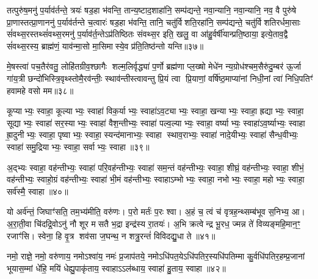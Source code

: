तत्पुरु॑ष॒मनु॑ प॒र्याव॑र्तन्ते॒ त्रयः॑ षड॒हा भ॑वन्ति॒ तान्य॒ष्टाद॒शाहा॑नि॒ सम्प॑द्यन्ते॒ नवा॒न्यानि॒ नवा॒न्यानि॒ नव॒ वै पुरु॑षे प्रा॒णास्तत्प्रा॒णाननु॑ प॒र्याव॑र्तन्ते च॒त्वारः॑ षड॒हा भ॑वन्ति॒ तानि॒ चतु॑र्विशति॒रहा॑नि॒ सम्प॑द्यन्ते॒ चतु॑र्विशतिरर्धमा॒साः सं॑वथ्स॒रस्तथ्सं॑वथ्स॒रमनु॑ प॒र्याव॑र्त॒न्तेऽप्र॑तिष्ठितः संवथ्स॒र इति॒ खलु॒ वा आ॑हु॒र्वर्\mbox{}षी॑यान्प्रति॒ष्ठाया॒ इत्ये॒ताव॒द्वै सं॑वथ्स॒रस्य॒ ब्राह्म॑णं॒ याव॑न्मा॒सो मा॒सिमास्ये॒व प्र॑ति॒तिष्ठ॑न्तो यन्ति॥३७॥

{\anuvakamend[{वि॒राज॑मे॒तेन॑ द्वाद॒शावे॒ताव॒द्वा अ॒ष्टौ च॑॥11॥}]}

मे॒षस्त्वा॑ पच॒तैर॑वतु॒ लोहि॑तग्रीव॒श्छागैः शल्म॒लिर्वृद्ध्या॑ प॒र्णो ब्रह्म॑णा प्ल॒ख्षो मेधे॑न न्य॒ग्रोध॑श्चम॒सैरु॑दु॒म्बर॑ ऊ॒र्जा गा॑य॒त्री छन्दो॑भिस्त्रि॒वृथ्स्तोमै॒रव॑न्तीः॒ स्थाव॑न्तीस्त्वावन्तु प्रि॒यं त्वा प्रि॒याणां॒ वर्\mbox{}षि॑ष्ठ॒माप्या॑नां निधी॒नां त्वा॑ निधि॒पतिꣳ॑ हवामहे वसो मम॥३८॥

{\anuvakamend[{मे॒षष्षट्त्रिꣳ॑शत्॥12॥}]}

कूप्याभ्यः॒ स्वाहा॒ कूल्याभ्यः॒ स्वाहा॑ विक॒र्याभ्यः॒ स्वाहा॑ऽव॒ट्याभ्यः॒ स्वाहा॒ खन्याभ्यः॒ स्वाहा॒ ह्रद्याभ्यः॒ स्वाहा॒ सूद्याभ्यः॒ स्वाहा॑ सर॒स्याभ्यः॒ स्वाहा॑ वैश॒न्तीभ्यः॒ स्वाहा॑ पल्व॒ल्याभ्यः॒ स्वाहा॒ वर्ष्याभ्यः॒ स्वाहा॑ऽव॒र्ष्याभ्यः॒ स्वाहा ह्रा॒दुनीभ्यः॒ स्वाहा॒ पृष्वाभ्यः॒ स्वाहा॒ स्यन्द॑मानाभ्यः॒ स्वाहा स्थाव॒राभ्यः॒ स्वाहा॑ नादे॒यीभ्यः॒ स्वाहा॑ सैन्ध॒वीभ्यः॒ स्वाहा॑ समु॒द्रियाभ्यः॒ स्वाहा॒ सर्वाभ्यः॒ स्वाहा॥३९॥

{\anuvakamend[{कूप्याभ्यश्चत्वारि॒ꣳ॒शत्॥13॥}]}

अ॒द्भ्यः स्वाहा॒ वह॑न्तीभ्यः॒ स्वाहा॑ परि॒वह॑न्तीभ्यः॒ स्वाहा॑ सम॒न्तं वह॑न्तीभ्यः॒ स्वाहा॒ शीघ्रं॒ वह॑न्तीभ्यः॒ स्वाहा॒ शीभं॒ वह॑न्तीभ्यः॒ स्वाहो॒ग्रं वह॑न्तीभ्यः॒ स्वाहा॑ भी॒मं वह॑न्तीभ्यः॒ स्वाहाऽम्भोभ्यः॒ स्वाहा॒ नभोभ्यः॒ स्वाहा॒ महोभ्यः॒ स्वाहा॒ सर्व॑स्मै॒ स्वाहा॥४०॥

{\anuvakamend[{अ॒द्भ्य एका॒न्नत्रि॒ꣳ॒शत्॥14॥}]}

यो अर्व॑न्तं॒ जिघाꣳ॑सति॒ तम॒भ्य॑मीति॒ वरु॑णः। प॒रो मर्तः॑ प॒रः श्वा। अ॒हं च॒ त्वं च॑ वृत्रह॒न्थ्सम्ब॑भूव स॒निभ्य॒ आ। अ॒रा॒ती॒वा चि॑दद्रि॒वोऽनु॑ नौ शूर मसतै भ॒द्रा इन्द्र॑स्य रा॒तयः॑। अ॒भि क्रत्वेन्द्र भू॒रध॒ ज्मन्न ते॑ विव्यङ्महि॒मान॒ꣳ॒ रजाꣳ॑सि। स्वेना॒ हि वृ॒त्र शव॑सा ज॒घन्थ॒ न शत्रु॒रन्तं॑ विविदद्यु॒धा ते॥४१॥

{\anuvakamend[{वि॒वि॒दद्द्वे च॑॥15॥}]}

नमो॒ राज्ञे॒ नमो॒ वरु॑णाय॒ नमोऽश्वा॑य॒ नमः॑ प्र॒जाप॑तये॒ नमोऽधि॑पत॒येऽधि॑पतिर॒स्यधि॑पतिम्मा कु॒र्वधि॑पतिर॒हम्प्र॒जानां भूयास॒म्मां धे॑हि॒ मयि॑ धेह्यु॒पाकृ॑ताय॒ स्वाहाऽऽल॑ब्धाय॒ स्वाहा॑ हु॒ताय॒ स्वाहा॥४२॥

